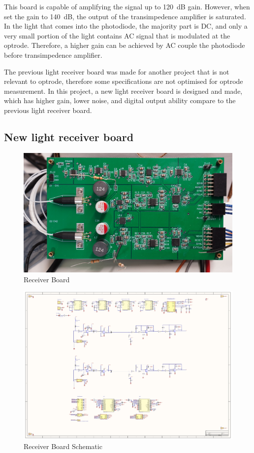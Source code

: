 This board is capable of amplifying the signal up to \qty{120}{dB} gain.  However, when set the gain to \qty{140}{dB}, the output of the transimpedence amplifier is saturated.  In the light that comes into the photodiode, the majority part is DC, and only a very small portion of the light contains AC signal that is modulated at the optrode.  Therefore, a higher gain can be achieved by AC couple the photodiode before transimpedence amplifier.

The previous light receiver board was made for another project that is not relevant to optrode, therefore some specifications are not optimised for optrode measurement.  In this project, a new light receiver board is designed and made, which has higher gain, lower noise, and digital output ability compare to the previous light receiver board.

\subsection{New light receiver board}

\begin{figure}[!ht]
\centering
\includegraphics[width=0.9\linewidth]{4-ANC_Sys/ReceiverBoard.jpg}
\caption{Receiver Board}
\label{fig_ReceiverBoard}
\end{figure}

\begin{figure}[!ht]
\centering
\includegraphics[width=0.9\linewidth]{4-ANC_Sys/ReceiverAmplifierBoardSchematic_23_5_2023.pdf}
\caption{Receiver Board Schematic}
\label{fig_sch}
\end{figure}

